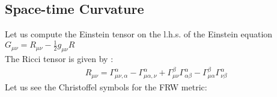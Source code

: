 \subsection{Space-time Curvature}
\hspace{0.5cm}Let us compute the Einstein tensor on the l.h.s. of the Einstein equation $G_{\mu \nu } = R_{\mu \nu } - \frac{1}{2} g_{\mu \nu } R$ \\ 
The Ricci tensor is given by :
\begin{align}
        R_{\mu \nu } = \Gamma^{\alpha }_{\mu \nu , \alpha } 
        - \Gamma^{\alpha }_{\mu \alpha , \nu }
        + \Gamma^{\beta }_{\mu \nu } \Gamma^{\alpha }_{\alpha \beta } 
        - \Gamma^{\beta}_{\mu \alpha } \Gamma^{\alpha }_{\nu \beta }
\end{align}
Let us see the Christoffel symbols for the FRW metric:
